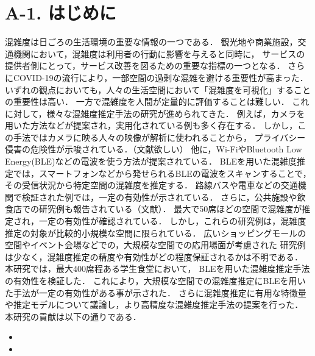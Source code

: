 \section*{A-1. はじめに}
混雑度は日ごろの生活環境の重要な情報の一つである．
観光地や商業施設，交通機関において，混雑度は利用者の行動に影響を与えると同時に，
サービスの提供者側にとって，サービス改善を図るための重要な指標の一つとなる．
さらにCOVID-19の流行により，一部空間の過剰な混雑を避ける重要性が高まった．
いずれの観点においても，人々の生活空間において「混雑度を可視化」することの重要性は高い．
一方で混雑度を人間が定量的に評価することは難しい．
これに対して，様々な混雑度推定手法の研究が進められてきた．
例えば，カメラを用いた方法などが提案され，実用化されている例も多く存在する．
しかし，この手法ではカメラに映る人々の映像が解析に使われることから，
プライバシー侵害の危険性が示唆されている．（文献欲しい）
他に，Wi-FiやBluetooth Low Energy(BLE)などの電波を使う方法が提案されている．
BLEを用いた混雑度推定では，スマートフォンなどから発せられるBLEの電波をスキャンすることで，
その受信状況から特定空間の混雑度を推定する．
路線バスや電車などの交通機関で検証された例では，一定の有効性が示されている．
さらに，公共施設や飲食店での研究例も報告されている（文献）．
最大で50席ほどの空間で混雑度が推定され，一定の有効性が確認されている．
しかし，これらの研究例は，混雑度推定の対象が比較的小規模な空間に限られている．
広いショッピングモールの空間やイベント会場などでの，大規模な空間での応用場面が考慮された
研究例は少なく，混雑度推定の精度や有効性がどの程度保証されるかは不明である．
本研究では，最大400席程ある学生食堂において，
BLEを用いた混雑度推定手法の有効性を検証した．
これにより，大規模な空間での混雑度推定にBLEを用いた手法が一定の有効性がある事が示された．
さらに混雑度推定に有用な特徴量や推定モデルについて議論し，より高精度な混雑度推定手法の提案を行った．
本研究の貢献は以下の通りである．
\begin{itemize}
  \item 
  \item 
\end{itemize}